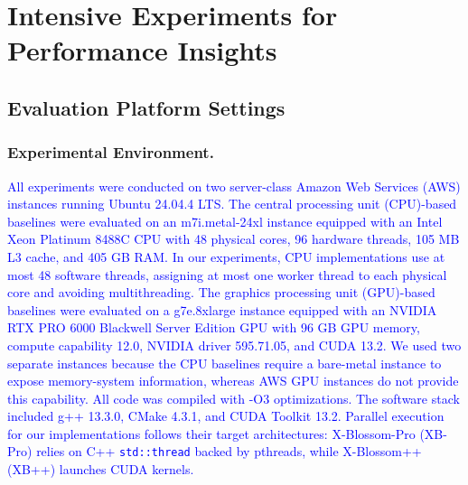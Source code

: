 \section{Intensive Experiments for Performance Insights}
\label{sec:intensive-experiments}

\subsection{Evaluation Platform Settings}
\subsubsection{Experimental Environment.}
\label{subsubsec:eval-exp-env}
\textcolor{blue}{
All experiments were conducted on two server-class Amazon Web Services (AWS) instances running Ubuntu 24.04.4 LTS. 
The \label{para:exp-setup-cpu}central processing unit (CPU)-based baselines were evaluated on an m7i.metal-24xl instance equipped with an Intel Xeon Platinum 8488C CPU with 48 physical cores, 96 hardware threads, 105 MB L3 cache, and 405 GB RAM.
In our experiments, CPU implementations use at most 48 software threads, assigning at most one worker thread to each physical core and avoiding multithreading.
The \label{para:exp-setup-gpu}graphics processing unit (GPU)-based baselines were evaluated on a g7e.8xlarge instance equipped with an NVIDIA RTX PRO 6000 Blackwell Server Edition GPU with 96 GB GPU memory, compute capability 12.0, NVIDIA driver 595.71.05, and CUDA 13.2.
We used two separate instances because the CPU baselines require a bare-metal instance to expose memory-system information, whereas AWS GPU instances do not provide this capability. 
All code was compiled with -O3 optimizations. The software stack included g++ 13.3.0, CMake 4.3.1, and CUDA Toolkit 13.2.
Parallel execution for our implementations follows their target architectures: X-Blossom-Pro (XB-Pro) relies on C++ \texttt{std::thread} backed by pthreads, while X-Blossom++ (XB++) launches CUDA kernels.
}

